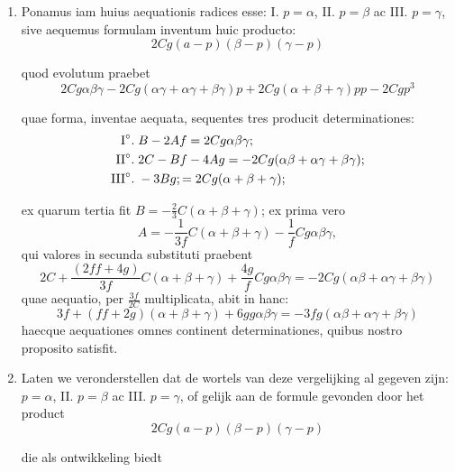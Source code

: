 \documentclass[10pt,a4paper]{article}
\newcommand{\switchenum}{\setcounter{enumi}{\arabic{enumi}-1}\switchcolumn}
\begin{document}
\begin{paracol}{2}
\begin{enumerate}[topsep=1px]
		\switchcolumn*
		
		\item Ponamus iam huius aequationis radices esse: I\degree. $p=\alpha$, II\degree. $p=\beta$ ac III\degree. $p=\gamma$, sive aequemus formulam inventum huic producto:
		\[
			2Cg(a-p)(\beta-p)(\gamma-p)
		\]
		\par quod evolutum praebet
		\[
			2Cg\alpha \beta \gamma - 2Cg(\alpha \gamma+\alpha \gamma+\beta \gamma)p+2Cg(\alpha+\beta+\gamma)pp - 2Cgp^3
		\]
		\par quae forma, inventae aequata, sequentes tres producit determinationes:
		\begin{align*}
			\text{I}\degree. \;& B-2Af = 2Cg\alpha\beta\gamma;\\
			\text{II}\degree. \; & 2C-Bf-4Ag = -2Cg(\alpha \beta +\alpha \gamma+\beta \gamma);\\
			\text{III}\degree. \; & -3Bg; = 2Cg(\alpha+\beta+\gamma);
		\end{align*}
		
		\par ex quarum tertia fit $B=-\frac{2}{3}C(\alpha+\beta+\gamma)$; ex prima vero
		\[
			A = -\frac{1}{3f}C(\alpha+\beta+\gamma)-\frac{1}{f}Cg\alpha \beta \gamma,
		\]
		qui valores in secunda substituti praebent
		\[
			2C+\frac{(2ff+4g)}{3f}C(\alpha+ \beta + \gamma)+\frac{4g}{f}Cg\alpha \beta \gamma  = -2Cg(\alpha \beta + \alpha \gamma+\beta \gamma)
		\]
		quae aequatio, per $\frac{3f}{2C}$ multiplicata, abit in hanc:
		\[
			3f+(ff+2g)(\alpha+\beta+\gamma)+6gg\alpha  \beta \gamma = -3fg(\alpha \beta + \alpha \gamma + \beta \gamma)
		\]
		haecque aequationes omnes continent determinationes, quibus nostro proposito satisfit.
		
		\switchenum
		\item Laten we veronderstellen dat de wortels van deze vergelijking al gegeven zijn: $p=\alpha$, II\degree. $p=\beta$ ac III\degree. $p=\gamma$, of gelijk aan de formule gevonden door het product
		\[
			2Cg(a-p)(\beta-p)(\gamma-p)
		\]
		
		\newpage
		
		\par die als ontwikkeling biedt
		

\end{enumerate}
\end{paracol}
\end{document}
